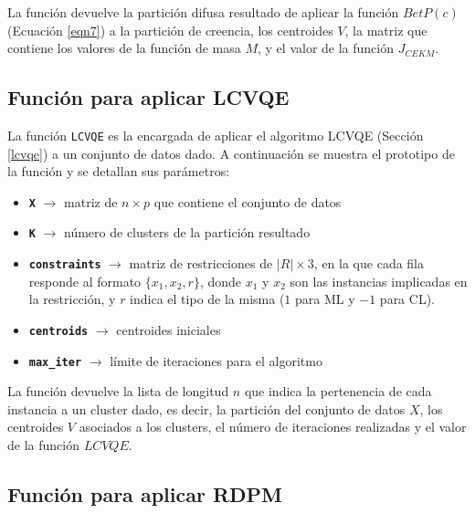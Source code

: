 La función devuelve la partición difusa resultado de aplicar la función $BetP(c)$ (Ecuación \ref{eqn7}) a la partición de creencia, los centroides $V$, la matriz que contiene los valores de la función de masa $M$, y el valor de la función $J_{CEKM}$.

\subsection{Función para aplicar LCVQE}

La función \texttt{LCVQE} es la encargada de aplicar el algoritmo \acs{LCVQE} (Sección \ref{lcvqe}) a un conjunto de datos dado. A continuación se muestra el prototipo de la función y se detallan sus parámetros:


\begin{itemize}
	
	\item \textbf{\texttt{X}} {$\longrightarrow$ matriz de $n \times p$ que contiene el conjunto de datos}
	
	\item \textbf{\texttt{K}} {$\longrightarrow$ número de clusters de la partición resultado}
	
	\item \textbf{\texttt{constraints}} {$\longrightarrow$ matriz de restricciones de $|R| \times 3$, en la que cada fila responde al formato $\{x_1, x_2, r\}$, donde $x_1$ y $x_2$ son las instancias implicadas en la restricción, y $r$ indica el tipo de la misma ($1$ para \acs{ML} y $-1$ para \acs{CL}).}
	
	\item \textbf{\texttt{centroids}} {$\longrightarrow$ centroides iniciales}
	
	\item \textbf{\texttt{max\_iter}} {$\longrightarrow$ límite de iteraciones para el algoritmo}
	
\end{itemize}

La función devuelve la lista de longitud $n$ que indica la pertenencia de cada instancia a un cluster dado, es decir, la partición del conjunto de datos $X$, los centroides $V$ asociados a los clusters, el número de iteraciones realizadas y el valor de la función $LCVQE$.

\subsection{Función para aplicar RDPM}

